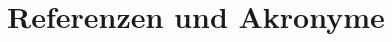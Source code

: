 \documentclass[10pt,a4paper]{article}
\begin{document}
\section{Referenzen und Akronyme}

\printglossaries


%
%

%


\listoffigures
\listoftables

\end{document}

